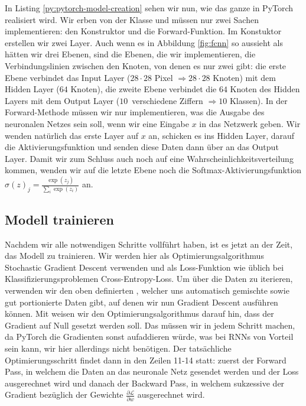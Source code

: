 
In Listing \ref{py:pytorch-model-creation} sehen wir nun, wie das ganze in PyTorch realisiert wird. 
Wir erben von der Klasse  und müssen nur zwei Sachen implementieren: 
den Konstruktor und die Forward-Funktion.
Im Konstuktor erstellen wir zwei Layer. Auch wenn es in Abbildung \ref{fig:fcnn} 
so aussieht als hätten wir drei Ebenen, sind die Ebenen, die wir implementieren, 
die Verbindungslinien zwischen den Knoten, von denen es nur zwei gibt: 
die erste Ebene verbindet das Input Layer (\(28 \cdot 28\) Pixel \(\Rightarrow 28 \cdot 28\) Knoten) 
mit dem Hidden Layer (\(64\) Knoten), die zweite Ebene verbindet die \(64\) Knoten des Hidden Layers
mit dem Output Layer (\(10\)~verschiedene Ziffern \(\Rightarrow 10\) Klassen).
In der Forward-Methode müssen wir nur implementieren, was die Ausgabe des 
neuronalen Netzes sein soll, wenn wir eine Eingabe \(x\) in das Netzwerk geben. 
Wir wenden natürlich das erste Layer auf \(x\) an, schicken es ins Hidden Layer, 
darauf die Aktivierungsfunktion und senden diese Daten dann über  an das Output Layer.
Damit wir zum Schluss auch noch auf eine Wahrscheinlichkeitsverteilung kommen, 
wenden wir auf die letzte Ebene noch die Softmax-Aktivierungsfunktion \(\sigma(z)_j = \frac{\exp(z_j)}{\sum_{i} \exp(z_i)}\) an.

\subsection{Modell trainieren}
Nachdem wir alle notwendigen Schritte vollführt haben, ist es jetzt an der Zeit, das Modell zu trainieren. 
Wir werden hier als Optimierungsalgorithmus Stochastic Gradient Descent verwenden und als Loss-Funktion 
wie üblich bei Klassifizierungsproblemen Cross-Entropy-Loss. 
Um über die Daten zu iterieren, verwenden wir den oben definierten 
, welcher uns automatisch gemischte sowie gut portionierte Daten 
gibt, auf denen wir nun Gradient Descent ausführen können. 
Mit  weisen wir den Optimierungsalgorithmus darauf hin, 
dass der Gradient auf Null gesetzt werden soll. Das müssen wir in jedem Schritt machen, 
da PyTorch die Gradienten sonst aufaddieren würde, was bei RNNs von Vorteil sein kann, wir hier allerdings nicht benötigen.
Der tatsächliche Optimierungsschritt findet dann in den Zeilen 11-14 statt: 
zuerst der Forward Pass, in welchem die Daten an das neuronale 
Netz gesendet werden und der Loss ausgerechnet wird und danach der Backward Pass, 
in welchem sukzessive der Gradient bezüglich der Gewichte \(\frac{\partial \mathcal{L}}{\partial w}\)
ausgerechnet wird.

